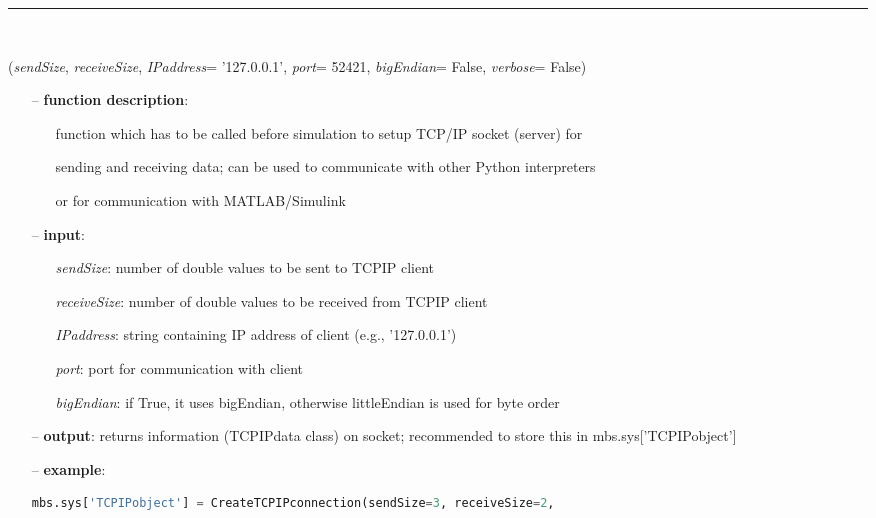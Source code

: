 \begin{itemize}[leftmargin=1.4cm]
%
\noindent\rule{8cm}{0.75pt}\vspace{1pt} \\ 
\begin{flushleft}
\label{sec:advancedUtilities:CreateTCPIPconnection}
({\it sendSize}, {\it receiveSize}, {\it IPaddress}= '127.0.0.1', {\it port}= 52421, {\it bigEndian}= False, {\it verbose}= False)
\end{flushleft}
\setlength{\itemindent}{0.7cm}
\begin{itemize}[leftmargin=0.7cm]
\item[--]
{\bf function description}: \vspace{-6pt}
\begin{itemize}[leftmargin=1.2cm]
\setlength{\itemindent}{-0.7cm}
\item[]function which has to be called before simulation to setup TCP/IP socket (server) for
\item[]sending and receiving data; can be used to communicate with other Python interpreters
\item[]or for communication with MATLAB/Simulink
\end{itemize}
\item[--]
{\bf input}: \vspace{-6pt}
\begin{itemize}[leftmargin=1.2cm]
\setlength{\itemindent}{-0.7cm}
\item[]{\it sendSize}: number of double values to be sent to TCPIP client
\item[]{\it receiveSize}: number of double values to be received from TCPIP client
\item[]{\it IPaddress}: string containing IP address of client (e.g., '127.0.0.1')
\item[]{\it port}: port for communication with client
\item[]{\it bigEndian}: if True, it uses bigEndian, otherwise littleEndian is used for byte order
\end{itemize}
\item[--]
{\bf output}: returns information (TCPIPdata class) on socket; recommended to store this in mbs.sys['TCPIPobject']
\item[--]
{\bf example}: \vspace{-12pt}\ei\begin{lstlisting}[language=Python, xleftmargin=36pt]
  mbs.sys['TCPIPobject'] = CreateTCPIPconnection(sendSize=3, receiveSize=2,

\end{lstlisting}
\end{itemize}
\end{itemize}
